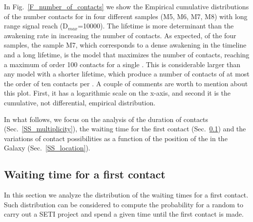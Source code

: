 In Fig.~\ref{F_number_of_contacts} we show the Empirical cumulative
distributions of the number contacts for \cetis in four different
samples (M5, M6, M7, M8) with long range signal reach
(D$_{max}$=10000). 
%
The lifetime is more determinant than the awakening rate in increasing
the number of contacts.
%
As expected, of the four samples, the sample M7, which corresponds to
a dense awakening in the timeline and a long lifetime, is the model
that maximizes the number of contacts, reaching a maximum of order 100
contacts for a single \ceti.
%
This is considerable larger than any model with a shorter lifetime,
which produce a number of contacts of at most the order of ten
contacts per \ceti.
%
A couple of comments are worth to mention about this plot.
%
First, it has a logarithmic scale on the x-axis, and second it is the
cumulative, not differential, empirical distribution.
 

In what follows, we focus on the analysis of the duration of contacts
(Sec.~\ref{SS_multiplicity}), the waiting time for the first contact
(Sec.~\ref{SS_waiting}) and the
variations of contact possibilities as a function of the position of
the \ceti in the Galaxy (Sec.~\ref{SS_location}).




\subsection{Waiting time for a first contact}\label{SS_waiting}

In this section we analyze the distribution of the waiting times for
a first contact.
%
Such distribution can be considered to compute the probability for a
random \ceti to carry out a SETI project and spend a given time until
the first contact is made. 


